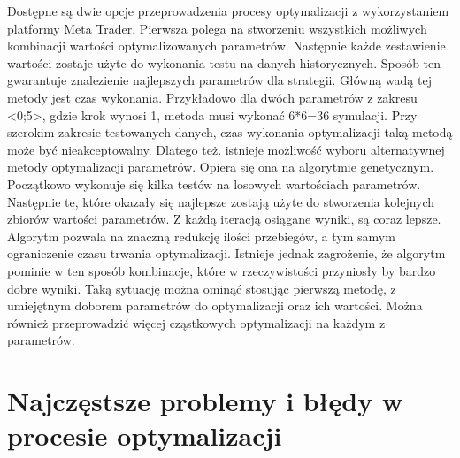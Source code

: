 \documentclass[pdflatex,11pt]{aghdpl}
\begin{document}
Dostępne są dwie opcje przeprowadzenia procesy optymalizacji z wykorzystaniem platformy Meta Trader. Pierwsza polega na stworzeniu wszystkich możliwych kombinacji wartości optymalizowanych parametrów. Następnie każde zestawienie wartości zostaje użyte do wykonania testu na danych historycznych. Sposób ten gwarantuje znalezienie najlepszych parametrów dla strategii. Główną wadą tej metody jest czas wykonania. Przykładowo dla dwóch parametrów z zakresu <0;5>, gdzie krok wynosi 1, metoda musi wykonać 6*6=36 symulacji. Przy szerokim zakresie testowanych danych, czas wykonania optymalizacji taką metodą może być nieakceptowalny. Dlatego też. istnieje możliwość wyboru alternatywnej metody optymalizacji parametrów. Opiera się ona na algorytmie genetycznym. Początkowo wykonuje się kilka testów na losowych wartościach parametrów. Następnie te, które okazały się najlepsze zostają użyte do stworzenia kolejnych zbiorów wartości parametrów. Z każdą iteracją osiągane wyniki, są coraz lepsze. Algorytm pozwala na znaczną redukcję ilości przebiegów, a tym samym ograniczenie czasu trwania optymalizacji. Istnieje jednak zagrożenie, że algorytm pominie w ten sposób kombinacje, które w rzeczywistości przyniosły by bardzo dobre wyniki. Taką sytuację można ominąć stosując pierwszą metodę, z umiejętnym doborem parametrów do optymalizacji oraz ich wartości. Można również przeprowadzić więcej cząstkowych optymalizacji na każdym z parametrów. 

\section{Najczęstsze problemy i błędy w procesie optymalizacji}
\paragraph{}
\end{document}

